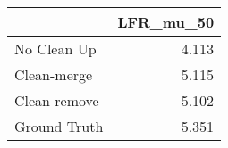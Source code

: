 \begin{tabular}{lr}
\toprule
{} & LFR_mu_50 \\
\midrule
No Clean Up  &     4.113 \\
Clean-merge  &     5.115 \\
Clean-remove &     5.102 \\
Ground Truth &     5.351 \\
\bottomrule
\end{tabular}
